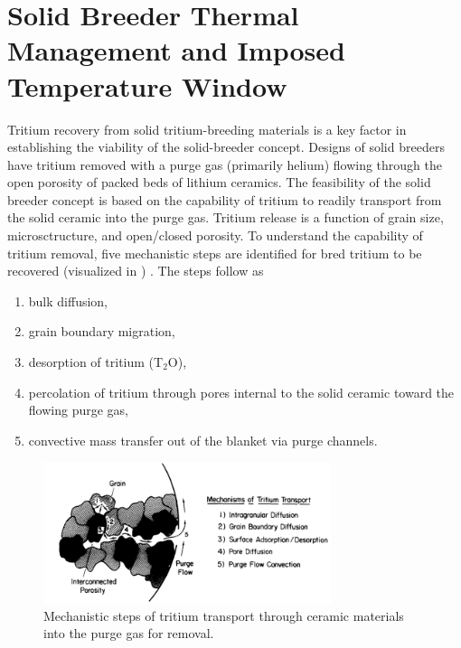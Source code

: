 \section{Solid Breeder Thermal Management and Imposed Temperature Window}

Tritium recovery from solid tritium-breeding materials is a key factor in establishing the viability of the solid-breeder concept. Designs of solid breeders have tritium removed with a purge gas (primarily helium) flowing through the open porosity of packed beds of lithium ceramics. The feasibility of the solid breeder concept is based on the capability of tritium to readily transport from the solid ceramic into the purge gas. Tritium release is a function of grain size, microsctructure, and open/closed porosity. To understand the capability of tritium removal, five mechanistic steps are identified for bred tritium to be recovered (visualized in ) . The steps follow as
\begin{enumerate}
\item bulk diffusion,
\item grain boundary migration,
\item desorption of tritium (T$_2$O),
\item percolation of tritium through pores internal to the solid ceramic toward the flowing purge gas,
\item convective mass transfer out of the blanket via purge channels.
\end{enumerate}

\begin{figure}[ht]
	\centering
	\includegraphics[width=0.75\textwidth]{figures/mechanisms_tritium_transport} 
	\caption{Mechanistic steps of tritium transport through ceramic materials into the purge gas for removal.}
	\label{fig:mechanisms_tritium_transport}
\end{figure}


